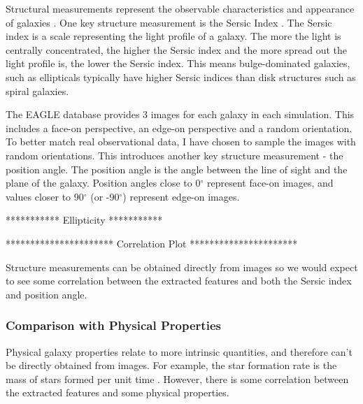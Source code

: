 \documentclass[12pt, onecolumn]{article}
\begin{document}
        Structural measurements represent the observable characteristics and appearance of galaxies \cite{structure_measurement}. One key structure measurement is the Sersic Index \cite{sersic_index}. The Sersic index is a scale representing the light profile of a galaxy. The more the light is centrally concentrated, the higher the Sersic index and the more spread out the light profile is, the lower the Sersic index. This means bulge-dominated galaxies, such as ellipticals typically have higher Sersic indices than disk structures such as spiral galaxies.

        
        The EAGLE database \cite{eagle_catalogue_public_release} provides 3 images for each galaxy in each simulation. This includes a face-on perspective, an edge-on perspective and a random orientation. To better match real observational data, I have chosen to sample the images with random orientations. This introduces another key structure measurement - the position angle. The position angle is the angle between the line of sight and the plane of the galaxy. Position angles close to 0$^{\circ}$ represent face-on images, and values closer to 90$^{\circ}$ (or -90$^{\circ}$) represent edge-on images.
        
        \vspace{5mm}

        ***********
        Ellipticity
        ***********

        \vspace{5mm}

        \vspace{5mm}

        **********************
        Correlation Plot
        **********************

        \vspace{5mm}
        
        Structure measurements can be obtained directly from images so we would expect to see some correlation between the extracted features and both the Sersic index and position angle.


        

        \subsubsection{Comparison with Physical Properties}
        \label{physical_propeties}

        Physical galaxy properties relate to more intrinsic quantities, and therefore can't be directly obtained from images. For example, the star formation rate is the mass of stars formed per unit time \cite{sfr_definition}. However, there is some correlation between the extracted features and some physical properties.
\end{document}
